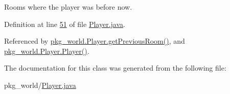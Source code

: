 Rooms where the player was before now. 



Definition at line \hyperlink{Player_8java_source_l00051}{51} of file \hyperlink{Player_8java_source}{Player.\-java}.



Referenced by \hyperlink{Player_8java_source_l00115}{pkg\-\_\-world.\-Player.\-get\-Previous\-Room()}, and \hyperlink{Player_8java_source_l00063}{pkg\-\_\-world.\-Player.\-Player()}.



The documentation for this class was generated from the following file\-:\begin{DoxyCompactItemize}
\item 
pkg\-\_\-world/\hyperlink{Player_8java}{Player.\-java}\end{DoxyCompactItemize}
